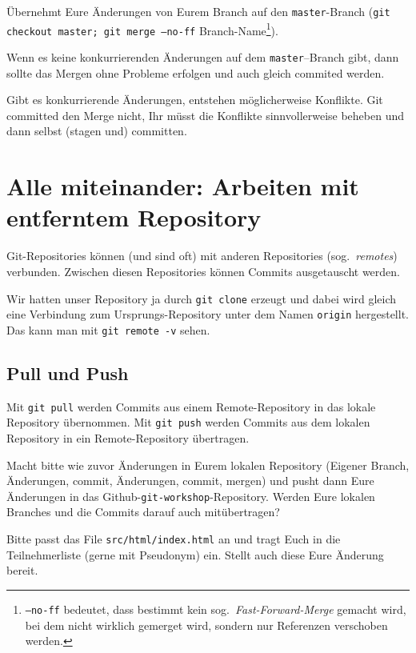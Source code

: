 \documentclass[a4paper, 12pt]{article}
\newcounter{enumisave}
\newenvironment{enumerate*}%
{\begin{enumerate}\setcounter{enumi}{\theenumisave}}%
{\setcounter{enumisave}{\theenumi}\end{enumerate}}
\begin{document}
\begin{enumerate*}

\item Übernehmt Eure Änderungen von Eurem Branch auf den \texttt{master}-Branch (\texttt{git checkout master; git merge --no-ff} \textsf{Branch-Name}\footnote{\texttt{--no-ff} bedeutet, dass bestimmt kein sog.\ \emph{Fast-Forward-Merge} gemacht wird, bei dem nicht wirklich gemerget wird, sondern nur Referenzen verschoben werden.}).

Wenn es keine konkurrierenden Änderungen auf dem \texttt{master}--Branch gibt,
dann sollte das Mergen ohne Probleme erfolgen und auch gleich commited werden.

Gibt es konkurrierende Änderungen, entstehen möglicherweise Konflikte. Git committed den Merge nicht, Ihr müsst die Konflikte sinnvollerweise beheben und
dann selbst (stagen und) committen.

\end{enumerate*}

\newpage
\section{Alle miteinander: Arbeiten mit entferntem Repository}
Git-Repositories können (und sind oft) mit anderen Repositories (sog.\ \emph{remotes}) verbunden. Zwischen diesen Repositories können Commits ausgetauscht
werden. 

Wir hatten unser Repository ja durch \texttt{git clone} erzeugt und dabei wird gleich eine Verbindung zum Ursprungs-Repository unter dem Namen \texttt{origin} hergestellt. Das kann man mit \texttt{git remote -v} sehen.


\subsection*{Pull und Push}\vspace{-1.5ex}
Mit \texttt{git pull} werden Commits aus einem Remote-Repository in das lokale
Repository übernommen. Mit \texttt{git push} werden Commits aus dem lokalen Repository in ein Remote-Repository übertragen.

\begin{enumerate*}
\item Macht bitte wie zuvor Änderungen in Eurem lokalen Repository (Eigener Branch, Änderungen, commit, Änderungen, commit, mergen) und pusht dann Eure Änderungen in das Github-\texttt{git-workshop}-Repository. Werden Eure lokalen Branches und die Commits darauf auch mitübertragen?

\item Bitte passt das File \texttt{src/html/index.html} an und tragt Euch in die Teilnehmerliste (gerne mit Pseudonym) ein. Stellt auch diese Eure Änderung bereit.

\end{enumerate*}
\newpage
\end{document}
